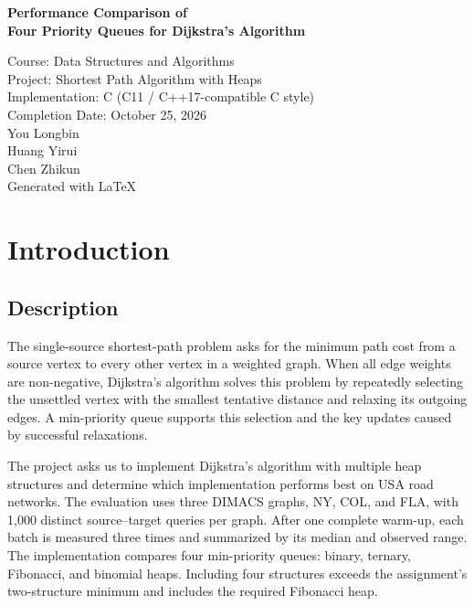 \documentclass[12pt,a4paper]{report}
\begin{document}
\begin{center}
  {\Huge\bfseries Performance Comparison of\\[0.35cm]
   Four Priority Queues for Dijkstra's Algorithm\par}
  \vspace{1.5cm}
  \Large Course: Data Structures and Algorithms\\[0.35cm]
  \Large Project: Shortest Path Algorithm with Heaps\\[0.35cm]
  \Large Implementation: C (C11 / C++17-compatible C style)\\[0.35cm]
  \Large Completion Date: October 25, 2026\\[1.2cm]
  \Large You Longbin \\
  \vspace{0.4cm}
  \Large Huang Yirui \\
  \vspace{0.4cm}
  \Large Chen Zhikun \\
  \vspace{1.5cm}
  \Large Generated with \LaTeX
\end{center}

\newpage
\tableofcontents
\newpage

\chapter{Introduction}

\section{Description}
The single-source shortest-path problem asks for the minimum path cost from a
source vertex to every other vertex in a weighted graph. When all edge weights
are non-negative, Dijkstra's algorithm solves this problem by repeatedly
selecting the unsettled vertex with the smallest tentative distance and
relaxing its outgoing edges. A min-priority queue supports this selection and
the key updates caused by successful relaxations.

The project asks us to implement Dijkstra's algorithm with multiple heap
structures and determine which implementation performs best on USA road
networks. The evaluation uses three DIMACS graphs, NY, COL, and FLA, with 1,000
distinct source--target queries per graph. After one complete warm-up,
each batch is measured three times and summarized by its median and
observed range. The implementation compares four
min-priority queues: binary, ternary, Fibonacci, and binomial heaps. Including
four structures exceeds the assignment's two-structure minimum and includes
the required Fibonacci heap.
\end{document}
